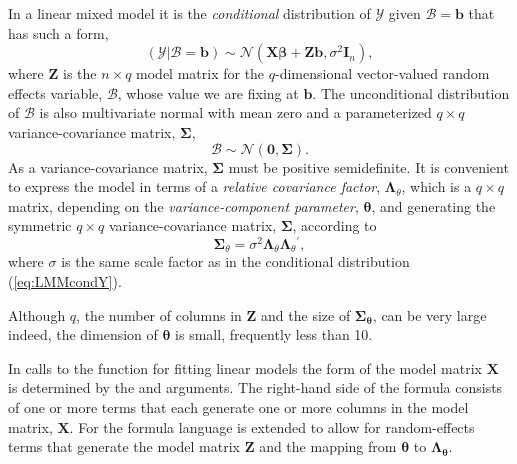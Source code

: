 \documentclass{jss}
\newcommand{\mc}[1]{\ensuremath{\mathcal{#1}}}
\newcommand{\trans}{\ensuremath{^\prime}}
\begin{document}
In a linear mixed model it is the \emph{conditional} distribution of
$\mc Y$ given $\mc B=\bm b$ that has such a form,%
\begin{equation}
  \label{eq:LMMcondY}
  (\mc Y|\mc B=\bm b)\sim\mc{N}(\bm X\bm\beta+\bm Z\bm b,\sigma^2\bm I_n),
\end{equation}%
where $\bm Z$ is the $n\times q$ model matrix for the $q$-dimensional
vector-valued random effects variable, $\mc B$, whose value we are
fixing at $\bm b$.  The unconditional distribution of $\mc B$ is also
multivariate normal with mean zero and a parameterized $q\times q$
variance-covariance matrix, $\bm\Sigma$,%
\begin{equation}
  \label{eq:LMMuncondB}
  \mc B\sim\mc N(\bm0,\bm\Sigma) .
\end{equation}%
As a variance-covariance matrix, $\bm\Sigma$ must be positive
semidefinite.  It is convenient to express the model in terms of a
\emph{relative covariance factor}, $\bm\Lambda_\theta$, which is a
$q\times q$ matrix, depending on the \emph{variance-component
  parameter}, $\bm\theta$, and generating the symmetric $q\times q$
variance-covariance matrix, $\bm\Sigma$, according to%
\begin{equation}
  \label{eq:relcovfac}
  \bm\Sigma_\theta=\sigma^2\bm\Lambda_\theta\bm\Lambda_\theta\trans ,
\end{equation}%
where $\sigma$ is the same scale factor as in the conditional
distribution (\ref{eq:LMMcondY}).

Although $q$, the number of columns in $\bm Z$ and the
size of $\bm\Sigma_{\bm\theta}$, can be very large indeed, the
dimension of $\bm\theta$ is small, frequently less than 10.

In calls to the  function for fitting linear models the form
of the model matrix $\bm X$ is determined by the  and
 arguments. The right-hand side of the formula consists of
one or more terms that each generate one or more columns in the model
matrix, $\bm X$.  For  the formula language is extended to
allow for random-effects terms that generate the model matrix $\bm Z$
and the mapping from $\bm\theta$ to $\bm\Lambda_{\bm\theta}$.
\end{document}

